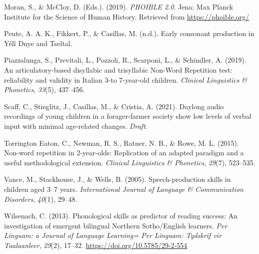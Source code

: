 \documentclass[english,,man,floatsintext]{apa6}
\begin{document}
\leavevmode\hypertarget{ref-phoible}{}%
Moran, S., \& McCloy, D. (Eds.). (2019). \emph{PHOIBLE 2.0}. Jena: Max Planck Institute for the Science of Human History. Retrieved from \url{https://phoible.org/}

\leavevmode\hypertarget{ref-peuteIPconsonants}{}%
Peute, A. A. K., Fikkert, P., \& Casillas, M. (n.d.). Early consonant production in Yélî Dnye and Tseltal.

\leavevmode\hypertarget{ref-piazzalunga2019articulatory}{}%
Piazzalunga, S., Previtali, L., Pozzoli, R., Scarponi, L., \& Schindler, A. (2019). An articulatory-based disyllabic and trisyllabic Non-Word Repetition test: reliability and validity in Italian 3-to 7-year-old children. \emph{Clinical Linguistics \& Phonetics}, \emph{33}(5), 437--456.

\leavevmode\hypertarget{ref-scaff2021daylong}{}%
Scaff, C., Stieglitz, J., Casillas, M., \& Cristia, A. (2021). Daylong audio recordings of young children in a forager-farmer society show low levels of verbal input with minimal age-related changes. \emph{Draft}.

\leavevmode\hypertarget{ref-torrington2015non}{}%
Torrington Eaton, C., Newman, R. S., Ratner, N. B., \& Rowe, M. L. (2015). Non-word repetition in 2-year-olds: Replication of an adapted paradigm and a useful methodological extension. \emph{Clinical Linguistics \& Phonetics}, \emph{29}(7), 523--535.

\leavevmode\hypertarget{ref-vance2005speech}{}%
Vance, M., Stackhouse, J., \& Wells, B. (2005). Speech-production skills in children aged 3--7 years. \emph{International Journal of Language \& Communication Disorders}, \emph{40}(1), 29--48.

\leavevmode\hypertarget{ref-wilsenach2013phonological}{}%
Wilsenach, C. (2013). Phonological skills as predictor of reading success: An investigation of emergent bilingual Northern Sotho/English learners. \emph{Per Linguam: a Journal of Language Learning= Per Linguam: Tydskrif vir Taalaanleer}, \emph{29}(2), 17--32. \url{https://doi.org/10.5785/29-2-554}
\end{document}
